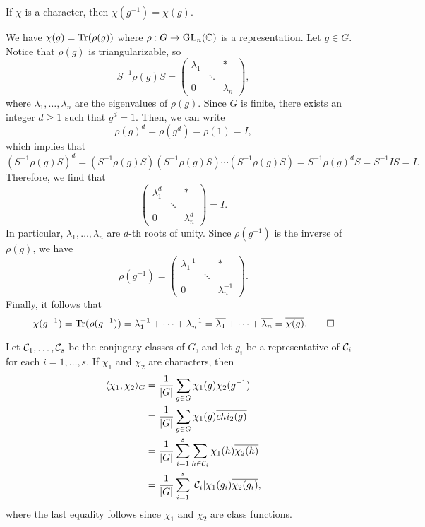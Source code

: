 \begin{remark}
    If $\chi$ is a character, then $\chi(g^{-1}) = \overline{\chi(g)}$. 
\end{remark}
\begin{pf}
    We have $\chi(g) = \operatorname{Tr}(\rho(g))$ where $\rho : G \to \operatorname{GL}_n(\mathbb{C})$ is a 
    representation. Let $g \in G$. Notice that $\rho(g)$ is triangularizable, 
    so 
    \[ S^{-1}\rho(g)S = \begin{pmatrix}
        \lambda_1 & & * \\ & \ddots & \\ 0 & & \lambda_n 
    \end{pmatrix}, \] 
    where $\lambda_1, \dots, \lambda_n$ are the eigenvalues of $\rho(g)$. 
    Since $G$ is finite, there exists an integer $d \geq 1$ such that $g^d = 1$. 
    Then, we can write 
    \[ \rho(g)^d = \rho(g^d) = \rho(1) = I, \] 
    which implies that 
    \[ (S^{-1}\rho(g)S)^d = (S^{-1}\rho(g)S)(S^{-1}\rho(g)S)\cdots 
    (S^{-1}\rho(g)S) = S^{-1}\rho(g)^d S = S^{-1}IS = I. \] 
    Therefore, we find that 
    \[ \begin{pmatrix}
        \lambda_1^d & & * \\ & \ddots & \\ 0 & & \lambda_n^d 
    \end{pmatrix} = I. \] 
    In particular, $\lambda_1, \dots, \lambda_n$ are $d$-th roots of unity. 
    Since $\rho(g^{-1})$ is the inverse of $\rho(g)$, we have 
    \[ \rho(g^{-1}) = \begin{pmatrix}
        \lambda_1^{-1} & & * \\ & \ddots & \\ 0 & & \lambda_n^{-1} 
    \end{pmatrix}. \] 
    Finally, it follows that 
    \[ \chi(g^{-1}) = \operatorname{Tr}(\rho(g^{-1})) = \lambda_1^{-1} + \cdots + \lambda_n^{-1}
    = \overline{\lambda_1} + \cdots + \overline{\lambda_n} = \overline{\chi(g)}. 
    \qedhere \] 
\end{pf}

Let ${\cal C}_1, \dots, {\cal C}_s$ be the conjugacy classes of $G$, and let 
$g_i$ be a representative of ${\cal C}_i$ for each $i = 1, \dots, s$. 
If $\chi_1$ and $\chi_2$ are characters, then 
\begin{align*}
    \langle \chi_1, \chi_2 \rangle_G 
    &= \frac1{|G|} \sum_{g\in G} \chi_1(g) \chi_2(g^{-1}) \\ 
    &= \frac1{|G|} \sum_{g\in G} \chi_1(g) \overline{chi_2(g)} \\ 
    &= \frac1{|G|} \sum_{i=1}^s \sum_{h\in{\cal C}_i} \chi_1(h) \overline{\chi_2(h)} \\
    &= \frac1{|G|} \sum_{i=1}^s |{\cal C}_i| \chi_1(g_i) \overline{\chi_2(g_i)},
\end{align*}
where the last equality follows since $\chi_1$ and $\chi_2$ are class functions. 

